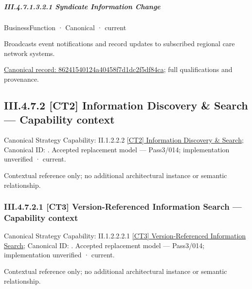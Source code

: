 \subparagraph*{III.4.7.1.3.2.1 Syndicate Information Change}
\label{navigation:III.4.7.1.3.2.1}

\label{element:86241540124a40458f7d1dc2f5df84ca}
{\small BusinessFunction · Canonical · current}\par

Broadcasts event notifications and record updates to subscribed regional care network systems.


{\footnotesize \href{../../../../continuum/business/business-function/86241540124a40458f7d1dc2f5df84ca.md}{Canonical record: 86241540124a40458f7d1dc2f5df84ca}; full qualifications and provenance.}\par
\subsection*{III.4.7.2 [CT2] Information Discovery \& Search — Capability context}
\label{navigation:III.4.7.2}

{\small Canonical Strategy Capability: II.1.2.2.2 \hyperref[element:6621b9a124d7444aa83793810531c388]{[CT2] Information Discovery \& Search}; Canonical ID: \texttt{}. Accepted replacement model — Pass3/014; implementation unverified · current.}\par
Contextual reference only; no additional architectural instance or semantic relationship.\par
\subsubsection*{III.4.7.2.1 [CT3] Version-Referenced Information Search — Capability context}
\label{navigation:III.4.7.2.1}

{\small Canonical Strategy Capability: II.1.2.2.2.1 \hyperref[element:1fb53b4061d04732822c496602c9df6c]{[CT3] Version-Referenced Information Search}; Canonical ID: \texttt{}. Accepted replacement model — Pass3/014; implementation unverified · current.}\par
Contextual reference only; no additional architectural instance or semantic relationship.\par
